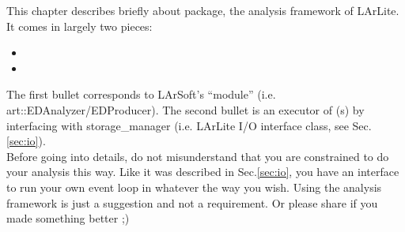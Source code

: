 
This chapter describes briefly about \Analysis package, the analysis framework of LArLite.
It comes in largely two pieces:
\begin{itemize}
\item \anaunit
\item \anaproc
\end{itemize}
The first bullet corresponds to LArSoft's ``module'' (i.e. {\ttfamily art::EDAnalyzer/EDProducer}).
The second bullet is an executor of \anaunit(s) by interfacing with {\ttfamily storage\_manager} (i.e. LArLite I/O interface class, see Sec.\ref{sec:io}). \\

Before going into details, do not misunderstand that you are constrained to do your analysis this way.
Like it was described in Sec.\ref{sec:io}, you have an interface to run your own event loop in whatever the way you wish.
Using the analysis framework is just a suggestion and not a requirement.
Or please share if you made something better ;)

\section{\anaunit}
\label{sec:ana_base}


\section{\anaproc}
\label{sec:ana_processor}

